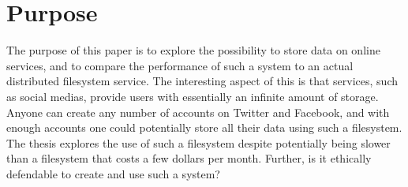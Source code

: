 
\section{Purpose}

The purpose of this paper is to explore the possibility to store data on online services, and to compare the performance of such a system to an actual distributed filesystem service. The interesting aspect of this is that services, such as social medias, provide users with essentially an infinite amount of storage. Anyone can create any number of accounts on Twitter and Facebook, and with enough accounts one could potentially store all their data using such a filesystem. The thesis explores the use of such a filesystem despite potentially being slower than a filesystem that costs a few dollars per month. Further, is it ethically defendable to create and use such a system?

